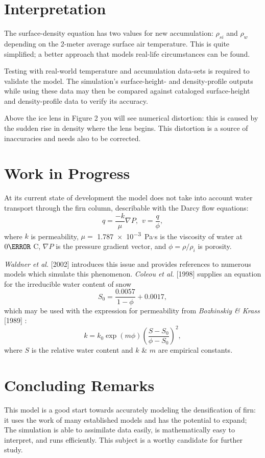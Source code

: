 \documentclass{article}%
\begin{document}
\section{Interpretation}

The surface-density equation has two values for new accumulation: $\rho_{si}$ and $\rho_w$ depending on the 2-meter average surface air temperature.  This is quite simplified; a better approach that models real-life circumstances can be found.  

Testing with real-world temperature and accumulation data-sets is required to validate the model.  The simulation's surface-height- and density-profile outputs while using these data may then be compared against cataloged surface-height and density-profile data to verify its accuracy.

Above the ice lens in Figure 2 you will see numerical distortion: this is caused by the sudden rise in density where the lens begins.  This distortion is a source of inaccuracies and needs also to be corrected.

\section{Work in Progress}
At its current state of development the model does not take into account water transport through the firn column, describable with the Darcy flow equations:
  $$
    q = \frac{-k}{\mu}\nabla P, \ \  v = \frac{q}{\phi},
  $$
where $k$ is permeability, $\mu =$ \SI{1.787e-3} Pa$\cdot$s is the viscosity of water at $0\degree$ C, $\nabla P$ is the pressure gradient vector, and $\phi = \rho/\rho_i$ is porosity.

\emph{Waldner et al.} [2002] introduces this issue and provides references to numerous models which simulate this phenomenon.  \emph{Coleou et al.} [1998] supplies an equation for the irreducible water content of snow
  $$
    S_0 = \frac{0.0057}{1 - \phi} + 0.0017,
  $$
which may be used with the expression for permeability from \emph{Bozhinskiy \& Krass} [1989] :
  $$
    k = k_0 \exp(m \phi)\left( \frac{S - S_0}{\phi - S_0} \right)^2,
  $$
where $S$ is the relative water content and $k$ \& $m$ are empirical constants.
\newpage


\section{Concluding Remarks}
This model is a good start towards accurately modeling the densification of firn: it uses the work of many established models and has the potential to expand;  The simulation is able to assimilate data easily, is mathematically easy to interpret, and runs efficiently.  This subject is a worthy candidate for further study.  
\end{document}
